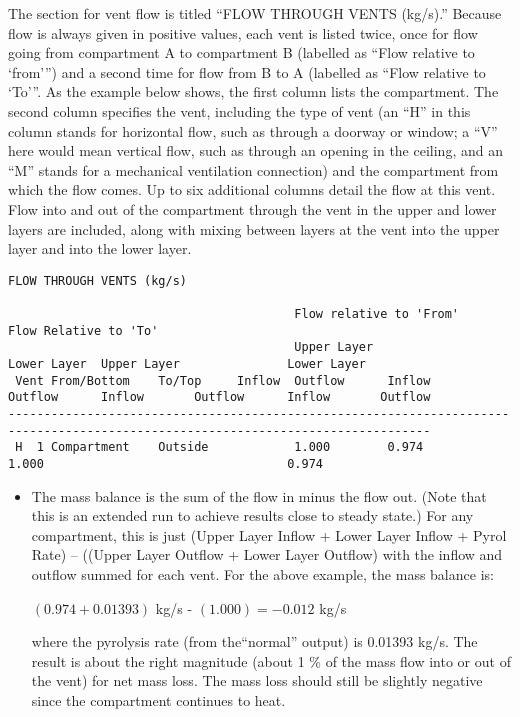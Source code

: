 The section for vent flow is titled ``FLOW THROUGH VENTS (kg/s).''  Because flow is always given in positive values, each vent is listed twice, once for flow going from compartment A to compartment B (labelled as ``Flow relative to `from''') and a second time for flow from B to A (labelled as ``Flow relative to `To'''.  As the example below shows, the first column lists the compartment.  The second column specifies the vent, including the type of vent (an ``H'' in this column stands for horizontal flow, such as through a doorway or window; a ``V'' here would mean vertical flow, such as through an opening in the ceiling, and an ``M'' stands for a mechanical ventilation connection) and the compartment from which the flow comes. Up to six additional columns detail the flow at this vent. Flow into and out of the compartment through the vent in the upper and lower layers are included, along with mixing between layers at the vent into the upper layer and into the lower layer.

\begin{lstlisting}[basicstyle=\tiny]
 FLOW THROUGH VENTS (kg/s)

                                        Flow relative to 'From'                Flow Relative to 'To'
                                        Upper Layer               Lower Layer  Upper Layer               Lower Layer
 Vent From/Bottom    To/Top     Inflow  Outflow      Inflow       Outflow      Inflow       Outflow      Inflow       Outflow
---------------------------------------------------------------------------------------------------------------------------------
 H  1 Compartment    Outside            1.000        0.974                     1.000                                  0.974   
\end{lstlisting}

\begin{itemize}
\item The mass balance is the sum of the flow in minus the flow out. (Note that this is an extended run to achieve results close to steady state.) For any compartment, this is just (Upper Layer Inflow + Lower Layer Inflow + Pyrol Rate) – ((Upper Layer Outflow + Lower Layer Outflow) with the inflow and outflow summed for each vent. For the above example, the mass balance is:

$(0.974 + 0.01393)$ kg/s - $(1.000) = -0.012$ kg/s

where the pyrolysis rate (from the``normal'' output) is 0.01393 kg/s. The result is about the right magnitude (about 1 \% of the mass flow into or out of the vent) for net mass loss.  The mass loss should still be slightly negative since the compartment continues to heat.
\end{itemize}

